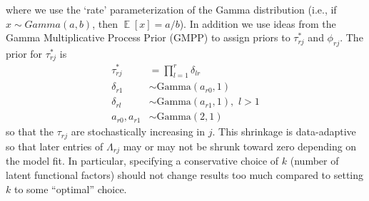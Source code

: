 \documentclass[useAMS,referee,usenatbib]{biom}
\DeclareMathOperator{\E}{\mathbb{E}}
\begin{document}
where we use the `rate' parameterization of the Gamma distribution (i.e., if $x \sim Gamma(a, b)$, then $\E[x] = a/b$). In addition we use ideas from the Gamma Multiplicative Process Prior (GMPP) \citep{Bhattacharya2011, Montagna2012} to assign priors to $\tau^{*}_{rj}$ and $\phi_{rj}$. The prior for $\tau^{*}_{rj}$ is
\begin{align}
\label{eq:shrink1}\tau^{*}_{rj} &= \prod_{l=1}^{r}\delta_{lr}\\
\label{eq:shrink2}\delta_{r1} &\sim \text{Gamma}(a_{r0}, 1)\\
\label{eq:shrink3}\delta_{rl} &\sim \text{Gamma}(a_{r1}, 1),\,\, l > 1\\
\label{eq:shrink4}a_{r0}, a_{r1} &\sim \text{Gamma}(2,1)
\end{align}
so that the $\tau_{rj}$ are stochastically increasing in $j$. This shrinkage is data-adaptive so that later entries of $\Lambda_{rj}$ may or may not be shrunk toward zero depending on the model fit. In particular, specifying a conservative choice of $k$ (number of latent functional factors) should not change results too much compared to setting $k$ to some ``optimal'' choice. 
\end{document}
